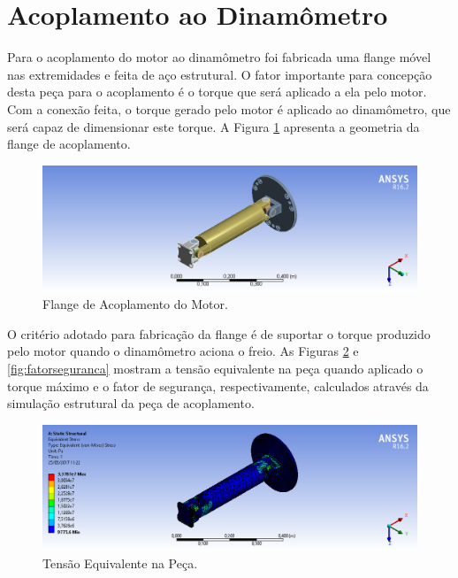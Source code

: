 \vfill

\section{Acoplamento ao Dinamômetro}

Para o acoplamento do motor ao dinamômetro foi fabricada uma flange móvel nas extremidades e feita de aço estrutural. O fator importante para concepção desta peça para o acoplamento é o torque que será aplicado a ela pelo motor. Com a conexão feita, o torque gerado pelo motor é aplicado ao dinamômetro, que será capaz de dimensionar este torque. A Figura \ref{fig:flange} apresenta a geometria da flange de acoplamento.

\begin{figure}[h!]
	\centering
	\includegraphics[keepaspectratio=true,scale= 0.35]{figuras/Geometria.png}
	\caption{Flange de Acoplamento do Motor.}
	\label{fig:flange}
\end{figure}

O critério adotado para fabricação da flange é de suportar o torque produzido pelo motor quando o dinamômetro aciona o freio. As Figuras \ref{fig:tesaoequivalente} e \ref{fig:fatorseguranca} mostram a tensão equivalente na peça quando aplicado o torque máximo e o fator de segurança, respectivamente, calculados através da simulação estrutural da peça de acoplamento.


\begin{figure}[h!]
	\centering
	\includegraphics[keepaspectratio=true,scale= 0.35]{figuras/Tensao_Equivalente.png}
	\caption{Tensão Equivalente na Peça.}
	\label{fig:tesaoequivalente}
\end{figure}

